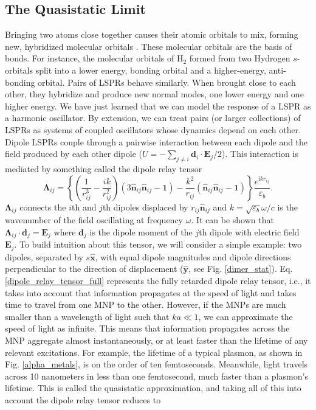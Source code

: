 \documentclass [11pt, proquest] {uwthesis}[2016/11/22]
\begin{document}
\subsection{The Quasistatic Limit}
Bringing two atoms close together causes their atomic orbitals to mix, forming new, hybridized molecular orbitals \cite{LennardJones}. These molecular orbitals are the basis of bonds. For instance, the molecular orbitals of $\textrm{H}_2$ formed from two Hydrogen $s$-orbitals split into a lower energy, bonding orbital and a higher-energy, anti-bonding orbital. Pairs of LSPRs behave similarly. When brought close to each other, they hybridize and produce new normal modes, one lower energy and one higher energy. We have just learned that we can model the response of a LSPR as a harmonic oscillator. By extension, we can treat pairs (or larger collections) of LSPRs as systems of coupled oscillators whose dynamics depend on each other. Dipole LSPRs couple through a pairwise interaction between each dipole and the field produced by each other dipole ($U = -\sum_{j\neq i}\textbf{d}_i\cdot\textbf{E}_j/2$). This interaction is mediated by something called the dipole relay tensor
\begin{equation}
\boldsymbol{\Lambda}_{ij} = \left\{\left(\frac{1}{r_{ij}^3} - \frac{ik}{r_{ij}^2}\right)\left(3\hat{\textbf{n}}_{ij}\hat{\textbf{n}}_{ij} - \textbf{1}\right) - \frac{k^2}{r_{ij}}\left(\hat{\textbf{n}}_{ij}\hat{\textbf{n}}_{ij} - \textbf{1}\right)\right\}\frac{e^{\textrm{i}kr_{ij}}}{\varepsilon_b}.
\label{dipole_relay_tensor_full}
\end{equation}
$\boldsymbol{\Lambda}_{ij}$ connects the $i$th and $j$th dipoles displaced by $r_{ij}\hat{\textbf{n}}_{ij}$ and $k=\sqrt{\varepsilon_b}\omega/c$ is the wavenumber of the field oscillating at frequency $\omega$. It can be shown that $\boldsymbol{\Lambda}_{ij}\cdot\textbf{d}_j = \textbf{E}_j$ where $\textbf{d}_j$ is the dipole moment of the $j$th dipole with electric field $\textbf{E}_j$. To build intuition about this tensor, we will consider a simple example: two dipoles, separated by $s\hat{\textbf{x}}$, with equal dipole magnitudes and dipole directions perpendicular to the direction of displacement ($\hat{\textbf{y}}$, see Fig. \ref{dimer_stat}). Eq. \ref{dipole_relay_tensor_full} represents the fully retarded dipole relay tensor, i.e., it takes into account that information propagates at the speed of light and takes time to travel from one MNP to the other. However, if the MNPs are much smaller than a wavelength of light such that $ka \ll 1$, we can approximate the speed of light as infinite. This means that information propagates across the MNP aggregate almost instantaneously, or at least faster than the lifetime of any relevant excitations. For example, the lifetime of a typical plasmon, as shown in Fig. \ref{alpha_metals}, is on the order of ten femtoseconds. Meanwhile, light travels across 10 nanometers in less than one femtosecond, much faster than a plasmon's lifetime. This is called the quasistatic approximation, and taking all of this into account the dipole relay tensor reduces to
\end{document}
